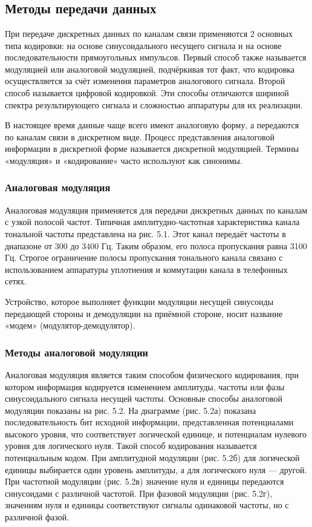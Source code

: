 \documentclass[
	a4paper,
	oneside,
	BCOR = 10mm,
	DIV = 12,
	12pt,
	headings = normal,
]{scrartcl}
\begin{document}
		\section{}
			\subsection{Методы передачи данных}
				При передаче дискретных данных по каналам связи применяются 2 основных типа кодировки: на основе синусоидального несущего сигнала и на основе последовательности прямоугольных импульсов. Первый способ также называется модуляцией или аналоговой модуляцией, подчёркивая тот факт, что кодировка осуществляется за счёт изменения параметров аналогового сигнала. Второй способ называется цифровой кодировкой. Эти способы отличаются шириной спектра результирующего сигнала и сложностью аппаратуры для их реализации.

				В настоящее время данные чаще всего имеют аналоговую форму, а передаются по каналам связи в дискретном виде. Процесс представления аналоговой информации в дискретной форме называется дискретной модуляцией. Термины «модуляция» и «кодирование» часто используют как синонимы. 

				\subsubsection{Аналоговая модуляция}
					Аналоговая модуляция применяется для передачи дискретных данных по каналам с узкой полосой частот. Типичная амплитудно-частотная характеристика канала тональной частоты представлена на рис. 5.1. Этот канал передаёт частоты в диапазоне от 300 до 3400 Гц. Таким образом, его полоса пропускания равна 3100 Гц. Строгое ограничение полосы пропускания тонального канала связано с использованием аппаратуры уплотнения и коммутации канала в телефонных сетях.

					Устройство, которое выполняет функции модуляции несущей синусоиды передающей стороны и демодуляции на приёмной стороне, носит название «модем» (модулятор-демодулятор).

				\subsubsection{Методы аналоговой модуляции}
					Аналоговая модуляция является таким способом физического кодирования, при котором информация кодируется изменением амплитуды, частоты или фазы синусоидального сигнала несущей частоты. Основные способы аналоговой модуляции показаны на рис. 5.2. На диаграмме (рис. 5.2а) показана последовательность бит исходной информации, представленная потенциалами высокого уровня, что соответствует логической единице, и потенциалам нулевого уровня для логического нуля. Такой способ кодирования называется потенциальным кодом. При амплитудной модуляции (рис. 5.2б) для логической единицы выбирается один уровень амплитуды, а для логического нуля — другой. При частотной модуляции (рис. 5.2в) значение нуля и единицы передаются синусоидами с различной частотой. При фазовой модуляции (рис. 5.2г), значениям нуля и единицы соответствуют сигналы одинаковой частоты, но с различной фазой.
\end{document}
